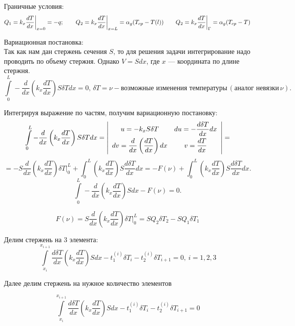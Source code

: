 \documentclass[a4paper, 12pt]{article}
\begin{document}
	Граничные условия:
	\[
	Q_1=k_x\frac{dT}{dx} \bigg{|}_{x=0} =-q; \qquad 	Q_2=k_x\frac{dT}{dx} \bigg{|}_{x=L} =\alpha_g(T_{cp}-T(l)) \qquad 	Q_2=k_x\frac{dT}{dx} \bigg{|}_{\Gamma} =\alpha_g(T_{cp}-T)
	\]

	Вариационная постановка: \\
	Так как нам дан стержень сечения $S$, то для решения задачи интегрирование надо проводить по объему стержня. Однако $V = S dx$, где $x$ — координата по длине стержня.
	\[
	\int\limits_0^L -\frac{d}{dx} \left( k_x \frac{dT}{dx} \right) S \delta T dx = 0, \, \delta T = \nu - \text{возможные изменения температуры} \, (\text{аналог невязки} \, \nu).
	\]
	
	Интегрируя выражение по частям, получим вариационную постановку:
	\[
	\int\limits_0^L -\frac{d}{dx} \left( k_x \frac{dT}{dx} \right) S \delta T dx = \left| 
	\begin{array}{cc}
		u= -k_x S  \delta T & du = -\dfrac{d \delta T}{dx} dx \vspace{0.1cm} \\
		dv=\dfrac{d}{d x}\left( \dfrac{d T}{d x}\right) dx & v = \dfrac{d T}{d x}
	\end{array} \right| = \]
	\[
	= -S \frac{d}{dx} \left( k_x \frac{dT}{dx} \right) \delta T \Big|_0^L + \int_0^L \left(k_x \frac{d T}{d x}\right) S \frac{d \delta T}{d x} d x = - F(\nu)+\int_0^L \left(k_x \frac{d T}{d x}\right) S \frac{d \delta T}{d x} d x.
	\]
	\[
	\int\limits_0^L -\frac{d}{dx} \left( k_x \frac{dT}{dx} \right) S dx - F(\nu) = 0.
	\]
	
	\[
	F(\nu) = S \frac{d}{dx} \left( k_x \frac{dT}{dx} \right) \delta T \Big|_0^L = S Q_2 \delta T_2 - S Q_1 \delta T_1
	\]
	
	Делим стержень на 3 элемента:
	\[
	\int\limits_{x_i}^{x_{i+1}} \frac{d\delta T}{dx} \left( k_x \frac{dT}{dx} \right) S dx -  t_1^{(i)} \delta T_i - t_2^{(i)}   \delta T_{i+1} = 0,\ i = 1, 2, 3
	\]

	
	
	
	
	
	
	
	
	
	
	
	
	
	
	
	
	
	
	
	Далее делим стержень на нужное количество элементов
	
	\[
	\int\limits_{x_i}^{x_{i+1}} \frac{d\delta T}{dx} \left( k_x \frac{dT}{dx} \right) S dx -  t_1^{(i)} \delta T_i - t_2^{(i)}   \delta T_{i+1} = 0
	\]
	
\end{document}
